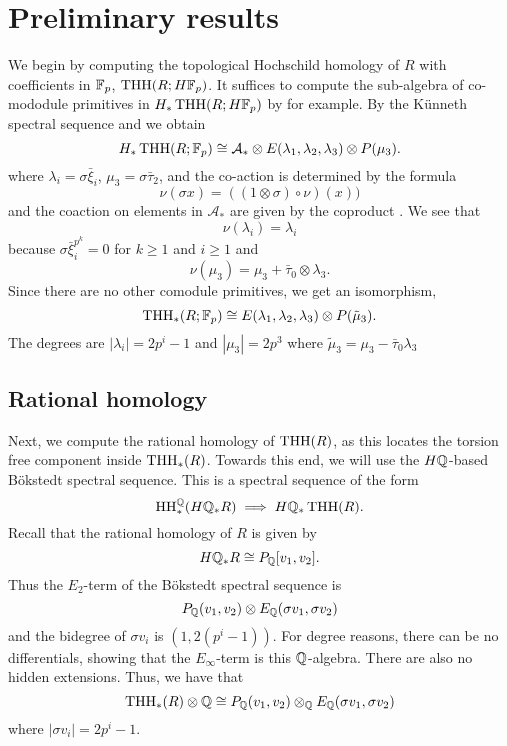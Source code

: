 
\section{Preliminary results}

We begin by computing the topological Hochschild homology of $R$ with coefficients in $\mathbb{F}_p$, $\operatorname{THH}(R;H\mathbb{F}_p)$. It suffices to compute the sub-algebra of co-mododule primitives in $H_*\operatorname{THH}(R;H\mathbb{F}_p)$ by \cite[Lem. 4.1]{AR12} for example. By the K\"unneth spectral sequence and \cite[Cor. 5.13]{AngeltveitRognes}
we obtain
\begin{equation}\label{eqn:HTHH(R;F_p)}
H_*\operatorname{THH}(R;\mathbb{F}_p)\cong \mathcal{A}_* \otimes E(\lambda_1, \lambda_2, \lambda_3)\otimes P(\mu_3).
\end{equation}
where $\lambda_i=\sigma \bar{\xi}_i$, $\mu_3=\sigma \bar{\tau}_2$, and the co-action is determined by the formula 
\[ \nu (\sigma x) =((1\otimes \sigma )\circ \nu )(x)) \]
and the coaction on elements in $\mathcal{A}_*$ are given by the coproduct \cite[Equation 5.11]{AngeltveitRognes}.  We see that 
\[ \nu(\lambda_i)=\lambda_i \]
because $\sigma \bar{\xi}_i^{p^k}=0$ for $k\ge 1$ and $i\ge 1$ and 
\[ \nu(\mu_3)=\mu_3+\bar{\tau}_0\otimes \lambda_3.\]
Since there are no other comodule primitives, we get an isomorphism,
\begin{equation}\label{eqn:THH(R;F_p)}
\operatorname{THH}_*(R;\mathbb{F}_p)\cong E(\lambda_1, \lambda_2, \lambda_3)\otimes P(\tilde{\mu}_3).
\end{equation}
The degrees are $|\lambda_i|=2p^i-1$ and $|\mu_3| = 2p^3$ where $\tilde{\mu}_3=\mu_3-\bar{\tau}_0 \lambda_3$

\subsection{Rational homology}

Next, we compute the rational homology of $\operatorname{THH}(R)$, as this locates the torsion free component inside $\operatorname{THH}_*(R)$. Towards this end, we will use the $H\mathbb{Q}$-based B\"okstedt spectral sequence. This is a spectral sequence of the form 
\[
\operatorname{HH}_*^{\mathbb{Q}}(H\mathbb{Q}_*R)\implies H\mathbb{Q}_*\operatorname{THH}(R).
\]
Recall that the rational homology of $R$ is given by 
\[
H\mathbb{Q}_*R\cong P_{\mathbb{Q}} [v_1,v_2].
\]
Thus the $E_2$-term of the B\"okstedt spectral sequence is 
\[
P_{\mathbb{Q}}(v_1, v_2)\otimes E_{\mathbb{Q}}( \sigma v_1,\sigma v_2)
\]
and the bidegree of $\sigma v_i$ is $(1,2(p^i-1))$. For degree reasons, there can be no differentials, showing that the $E_\infty$-term is this $\mathbb{Q}$-algebra. There are also no hidden extensions. Thus, we have that 
\[
\operatorname{THH}_*(R)\otimes \mathbb{Q}\cong P_{\mathbb{Q}}(v_1,v_2)\otimes_{\mathbb{Q}} E_{\mathbb{Q}}(\sigma v_1,\sigma v_2)
\]
where $|\sigma v_i|=2p^i-1$. 